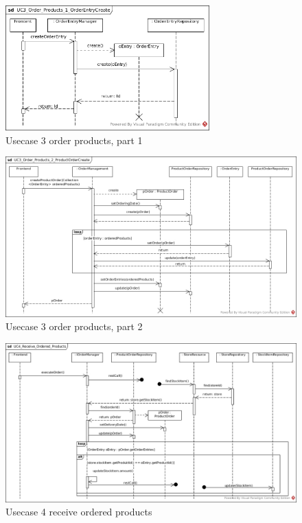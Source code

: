 			\begin{figure}[!h]
				\centering
				\includegraphics[width = 0.7\textwidth]{img/UC3_Order_Products_1_OrderEntryCreate.jpg}
				\caption{Usecase 3 order products, part 1}
				\label{MS_UC3_1}
			\end{figure}
			
			\begin{figure}[!h]
				\centering
				\includegraphics[width = 1\textwidth]{img/UC3_Order_Products_2_ProductOrderCreate.jpg}
				\caption{Usecase 3 order products, part 2}
				\label{MS_UC3_2}
			\end{figure}
		
			
			\begin{figure}[!h]
				\centering
				\includegraphics[width = 1\textwidth]{img/UC4_Receive_Ordered_Products.jpg}
				\caption{Usecase 4 receive ordered products}
				\label{MS_UC4}
			\end{figure}
			

